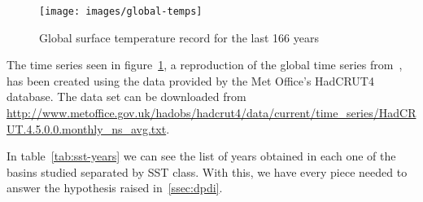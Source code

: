 \begin{figure}[H]
	\centering
	\texttt{[image: images/global-temps]}
	\caption{Global surface temperature record for the last 166 years}
	\label{fig:global-temps}
\end{figure}

The time series seen in figure~\ref{fig:global-temps}, a reproduction of the global time series from~\cite{o:hadcrut4-diagnostics}, has been created using the data provided by the Met Office's HadCRUT4 database. The data set can be downloaded from \url{http://www.metoffice.gov.uk/hadobs/hadcrut4/data/current/time_series/HadCRUT.4.5.0.0.monthly_ns_avg.txt}.

\sk
In table~\ref{tab:sst-years} we can see the list of years obtained in each one of the basins studied separated by SST class. With this, we have every piece needed to answer the hypothesis raised in~\cref{ssec:dpdi}.
\begin{table}[H]
	\centering
	\caption{Separation of the years as a function of the value of the SST}
	\label{tab:sst-years}
\end{table}
